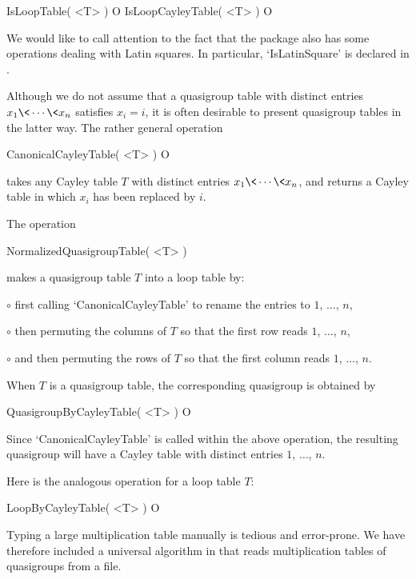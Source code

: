 \>IsLoopTable( <T> ) O
\>IsLoopCayleyTable( <T> ) O

We would like to call attention to the fact that the package 
also has some operations dealing with Latin squares. In particular,
`IsLatinSquare' is declared in .


Although we do not assume that a quasigroup table with distinct entries
$x_1\<\cdots\<x_n$ satisfies $x_i=i$, it is often desirable to present
quasigroup tables in the latter way. The rather general operation

\>CanonicalCayleyTable( <T> ) O

takes any Cayley table $T$ with distinct entries $x_1\<\cdots\<x_n$, and
returns a Cayley table in which $x_i$ has been replaced by $i$.

The operation

\>NormalizedQuasigroupTable( <T> )

makes a quasigroup table $T$ into a loop table by:
\beginlist%
\item{$\circ$} first calling `CanonicalCayleyTable' to rename the entries to $1$,
    $\dots$, $n$,
\item{$\circ$} then permuting the columns of $T$ so that the first row reads
    $1$, $\dots$, $n$,
\item{$\circ$} and then permuting the rows of $T$ so that the first column
    reads $1$, $\dots$, $n$.
\endlist


When $T$ is a quasigroup table, the corresponding quasigroup is obtained by

\>QuasigroupByCayleyTable( <T> ) O

Since `CanonicalCayleyTable' is called within the above operation, the
resulting quasigroup will have a Cayley table with distinct entries $1$,
$\dots$, $n$.

Here is the analogous operation for a loop table $T$:

\>LoopByCayleyTable( <T> ) O


Typing a large multiplication table manually is tedious and error-prone. We
have therefore included a universal algorithm in {\LOOPS} that reads
multiplication tables of quasigroups from a file.

